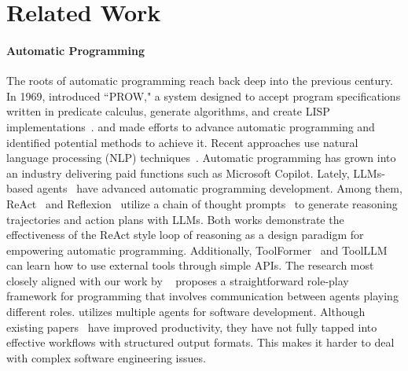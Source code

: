 \section{Related Work}
\paragraph{Automatic Programming} 
The roots of automatic programming reach back deep into the previous century.
%
In 1969, \citet{waldinger69} introduced ``PROW," a system designed to accept program specifications written in predicate calculus, generate algorithms, and create LISP implementations~\citep{mccarthy1978history}.
%
\citet{balzer1985} and \citet{soloway1986} made efforts to advance automatic programming and identified potential methods to achieve it.
%
Recent approaches use natural language processing (NLP) techniques~\citep{ni2023lever,skreta2023errors,feng2020codebert,li2022competition,chen2018execution,chen2021latent,zhang2023building,liu2023ml,tang2023biocoder,muennighoff2023octopack}. 
% 
Automatic programming has grown into an industry delivering paid functions such as Microsoft Copilot.
%
Lately, LLMs-based agents~\citep{yao2022react,shinn2023reflexion,lin2023swiftsage} have advanced automatic programming development. 
% 
Among them, ReAct~\citep{yao2022react} and Reflexion~\citep{shinn2023reflexion} utilize a chain of thought prompts~\citep{wei2022chain} to generate reasoning trajectories and action plans with LLMs.
%
Both works demonstrate the effectiveness of the ReAct style loop of reasoning as a design paradigm for empowering automatic programming.
%
Additionally, ToolFormer~\citep{schick2023toolformer} and ToolLLM~\citep{qin2023toolllm} can learn how to use external tools through simple APIs.
%
The research most closely aligned with our work by ~\citet{li2023camel} proposes a straightforward role-play framework for programming that involves communication between agents playing different roles.
%
\citet{qian2023communicative} utilizes multiple agents for software development.
%
Although existing papers~\citep{li2023camel,qian2023communicative} have improved productivity, they have not fully tapped into effective workflows with structured output formats. This makes it harder to deal with complex software engineering issues.

